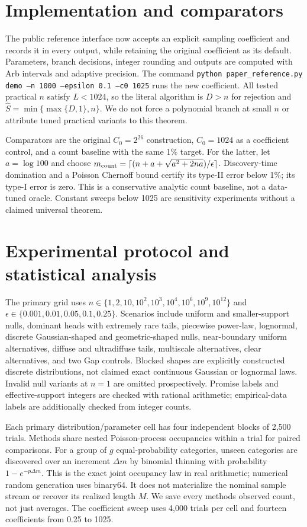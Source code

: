 \section{Implementation and comparators}

The public reference interface now accepts an explicit sampling coefficient and records it in every output, while retaining the original coefficient as its default. Parameters, branch decisions, integer rounding and outputs are computed with Arb intervals and adaptive precision. The command \texttt{python paper\_reference.py demo --n 1000 --epsilon 0.1 --c0 1025} runs the new coefficient. All tested practical $n$ satisfy $L<1024$, so the literal algorithm is $D>n$ for rejection and $\widehat S=\min\{\max\{D,1\},n\}$. We do not force a polynomial branch at small $n$ or attribute tuned practical variants to this theorem.

Comparators are the original $C_0=2^{26}$ construction, $C_0=1024$ as a coefficient control, and a count baseline with the same 1\% target. For the latter, let $a=\log100$ and choose $m_{\rm count}=\lceil(n+a+\sqrt{a^2+2na})/\epsilon\rceil$. Discovery-time domination and a Poisson Chernoff bound certify its type-II error below 1\%; its type-I error is zero. This is a conservative analytic count baseline, not a data-tuned oracle. Constant sweeps below 1025 are sensitivity experiments without a claimed universal theorem.

\section{Experimental protocol and statistical analysis}

The primary grid uses $n\in\{1,2,10,10^2,10^3,10^4,10^6,10^9,10^{12}\}$ and $\epsilon\in\{0.001,0.01,0.05,0.1,0.25\}$. Scenarios include uniform and smaller-support nulls, dominant heads with extremely rare tails, piecewise power-law, lognormal, discrete Gaussian-shaped and geometric-shaped nulls, near-boundary uniform alternatives, diffuse and ultradiffuse tails, multiscale alternatives, clear alternatives, and two Gap controls. Blocked shapes are explicitly constructed discrete distributions, not claimed exact continuous Gaussian or lognormal laws. Invalid null variants at $n=1$ are omitted prospectively. Promise labels and effective-support integers are checked with rational arithmetic; empirical-data labels are additionally checked from integer counts.

Each primary distribution/parameter cell has four independent blocks of 2,500 trials. Methods share nested Poisson-process occupancies within a trial for paired comparisons. For a group of $g$ equal-probability categories, unseen categories are discovered over an increment $\Delta m$ by binomial thinning with probability $1-e^{-p\Delta m}$. This is the exact joint occupancy law in real arithmetic; numerical random generation uses binary64. It does not materialize the nominal sample stream or recover its realized length $M$. We save every method\textquotesingle s observed count, not just averages. The coefficient sweep uses 4,000 trials per cell and fourteen coefficients from 0.25 to 1025.

